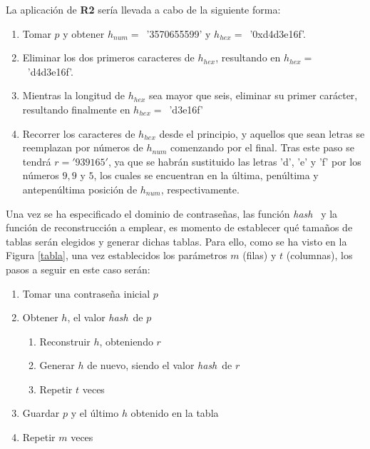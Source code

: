 \documentclass[12pt,spanish,listoffigures,listoftables]{tfgetsinf}
\newcommand{\hash}{\textit{hash}}
\begin{document}
La aplicación de \textbf{R2} sería llevada a cabo de la siguiente forma:

\begin{enumerate}

    \item Tomar $p$ y obtener $h_{num} =$~'3570655599' y $h_{hex} =$~'0xd4d3e16f'.
    
    \item Eliminar los dos primeros caracteres de $h_{hex}$, resultando en $h_{hex} =$~'d4d3e16f'.
    
    \item Mientras la longitud de $h_{hex}$ sea mayor que seis, eliminar su primer carácter, resultando finalmente en $h_{hex} =$~'d3e16f'
    
    \item Recorrer los caracteres de $h_{hex}$ desde el principio, y aquellos que sean letras se reemplazan por números de $h_{num}$ comenzando por el final. Tras este paso se tendrá $r = '939165'$, ya que se habrán sustituido las letras 'd', 'e' y 'f' por los números $9, 9$ y $5$, los cuales se encuentran en la última, penúltima y antepenúltima posición de $h_{num}$, respectivamente.
    
\end{enumerate}

Una vez se ha especificado el dominio de contraseñas, las función \hash~ y la función de reconstrucción a emplear, es momento de establecer qué tamaños de tablas serán elegidos y generar dichas tablas. Para ello, como se ha visto en la Figura \ref{tabla}, una vez establecidos los parámetros $m$ (filas) y $t$ (columnas), los pasos a seguir en este caso serán:

\begin{enumerate}[label*=\arabic*.]

    \item Tomar una contraseña inicial $p$
    
    \item Obtener $h$, el valor \hash~de $p$
    
    \begin{enumerate}[label*=\arabic*.]
    
        \item Reconstruir $h$, obteniendo $r$
        
        \item Generar $h$ de nuevo, siendo el valor \hash~de $r$
        
        \item Repetir $t$ veces
        
    \end{enumerate}
    
    \item Guardar $p$ y el último $h$ obtenido en la tabla
    
    \item Repetir $m$ veces
    
\end{enumerate}
\end{document}
